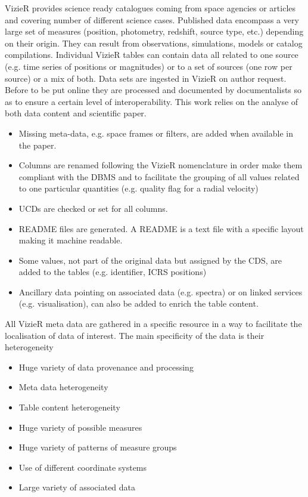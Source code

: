%
VizieR provides science ready catalogues coming from space agencies or articles and covering number of different science cases.
Published data encompass a very large set of measures (position, photometry, redshift, source type, etc.) depending on their origin.
They can result from  observations, simulations, models or catalog compilations.
Individual VizieR tables can contain data all related to one source (e.g. time series of positions or magnitudes) or to a set of sources (one row per source) or a mix of both.
%
Data sets are ingested in VizieR on author request. Before to be put online they are processed and documented by documentalists so as to ensure a certain level of interoperability.
This work relies on the analyse of both data content and scientific paper.
\begin{itemize}
\item Missing meta-data, e.g. space frames or filters, are added when available in the paper.
\item Columns are renamed following the VizieR nomenclature in order make them compliant with the DBMS and to facilitate the grouping of all values related to one particular quantities (e.g. quality flag for a radial velocity)
\item UCDs are checked or set for all columns.
\item README files are generated. A README is a text file with a specific layout making it machine readable.
\item Some values, not part of the original data but assigned by the CDS, are added to the tables (e.g. identifier, ICRS positions)
\item Ancillary data pointing on associated data (e.g.  spectra) or on linked services (e.g. visualisation), can also be added to enrich the table content.
\end{itemize}

All VizieR meta data are gathered in a specific resource in a way to facilitate the localisation of data of interest.
The main specificity of the data is their heterogeneity
\begin{itemize}
\item Huge variety of data provenance and processing
\item Meta data heterogeneity
\item Table content heterogeneity
\item Huge variety of possible measures
\item Huge variety of patterns of measure groups
\item Use of different coordinate systems
\item Large variety of associated data
\end{itemize}

